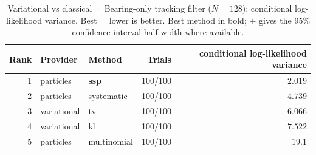 \begin{table}[!htbp]
\centering
\small
\caption{Variational vs classical · Bearing-only tracking filter ($N=128$): conditional log-likelihood variance. Best = lower is better. Best method in bold; $\pm$ gives the 95\% confidence-interval half-width where available.}
\label{tab:variational-vs-classical-bearing-only-tracking-filter-conditional-loglik-variance}
\begin{tabular}{rllrr}
\toprule
Rank & Provider & Method & Trials & conditional log-likelihood variance \\
\midrule
1 & particles & \textbf{ssp} & 100/100 & $\mathbf{2.019}$ \\
2 & particles & systematic & 100/100 & $4.739$ \\
3 & variational & tv & 100/100 & $6.066$ \\
4 & variational & kl & 100/100 & $7.522$ \\
5 & particles & multinomial & 100/100 & $19.1$ \\
\bottomrule
\end{tabular}
\end{table}


